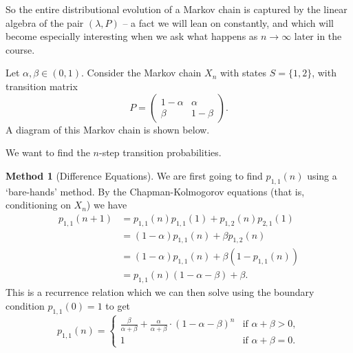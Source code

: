 \documentclass[a4paper]{scrartcl}
\begin{document}
So the entire distributional evolution of a Markov chain is captured by the linear algebra of the pair $(\lambda, P)$ -- a fact we will lean on constantly, and which will become especially interesting when we ask what happens as $n \rightarrow \infty$ later in the course.

\begin{example}
	Let $\alpha, \beta \in (0, 1)$. 
	Consider the Markov chain $X_n$ with states $S = \{1, 2\}$, with transition matrix 
	$$
	P = \begin{pmatrix}
		1 - \alpha & \alpha \\
		\beta & 1 - \beta
	\end{pmatrix}.
	$$
	A diagram of this Markov chain is shown below.
	\begin{center}
	\end{center}

	We want to find the $n$-step transition probabilities.

	\textbf{Method 1} (Difference Equations). We are first going to find $p_{1, 1}(n)$ using a `bare-hands' method. By the Chapman-Kolmogorov equations (that is, conditioning on $X_n$) we have
	\begin{align*}
		p_{1, 1}(n + 1) &= p_{1, 1}(n)p_{1, 1}(1) + p_{1, 2}(n) p_{2, 1}(1) \\
		&= (1 - \alpha)p_{1, 1}(n) + \beta p_{1, 2}(n) \\
		&= (1 - \alpha)p_{1, 1}(n) + \beta (1 - p_{1, 1}(n)) \\
		&= p_{1, 1}(n)(1 - \alpha - \beta) + \beta.
	\end{align*}
	This is a recurrence relation which we can then solve using the boundary condition $p_{1, 1}(0) = 1$ to get
	$$
		p_{1, 1}(n) = \begin{cases}
			\frac{\beta}{\alpha+\beta}+\frac{\alpha}{\alpha+\beta} \cdot(1-\alpha-\beta)^{n} &\mbox{if } \alpha + \beta > 0, \\
			1 &\mbox{if } \alpha + \beta = 0.
		   \end{cases}
	$$


\end{example}
\end{document}
